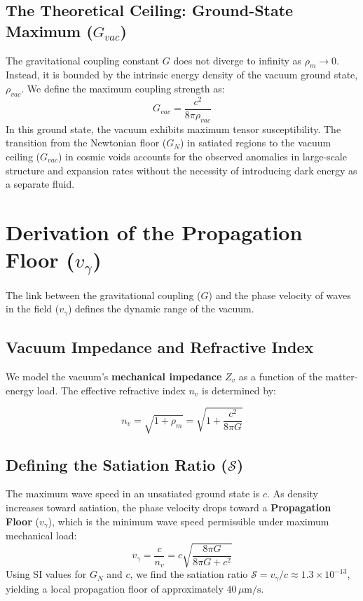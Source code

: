 \documentclass[12pt,a4paper]{article}
\begin{document}
\subsection{The Theoretical Ceiling: Ground-State Maximum ($G_{vac}$)}
The gravitational coupling constant $G$ does not diverge to infinity as $\rho_m \to 0$. Instead, it is bounded by the intrinsic energy density of the vacuum ground state, $\rho_{vac}$. We define the maximum coupling strength as:
\begin{equation}
G_{vac} = \frac{c^2}{8\pi \rho_{vac}}
\end{equation}
In this ground state, the vacuum exhibits maximum tensor susceptibility. The transition from the Newtonian floor ($G_N$) in satiated regions to the vacuum ceiling ($G_{vac}$) in cosmic voids accounts for the observed anomalies in large-scale structure and expansion rates without the necessity of introducing dark energy as a separate fluid.

\section{Derivation of the Propagation Floor ($v_{\gamma}$)}
The link between the gravitational coupling ($G$) and the phase velocity of waves in the field ($v_{\gamma}$) defines the dynamic range of the vacuum.

\subsection{Vacuum Impedance and Refractive Index}
We model the vacuum's \textbf{mechanical impedance} $Z_v$ as a function of the matter-energy load. The effective refractive index $n_v$ is determined by:

\begin{equation}
n_v = \sqrt{1 + \rho_m} = \sqrt{1 + \frac{c^2}{8\pi G}}
\end{equation}

\subsection{Defining the Satiation Ratio ($\mathcal{S}$)}
The maximum wave speed in an unsatiated ground state is $c$. As density increases toward satiation, the phase velocity drops toward a \textbf{Propagation Floor} ($v_{\gamma}$), which is the minimum wave speed permissible under maximum mechanical load:
\begin{equation}
v_{\gamma} = \frac{c}{n_v} = c \sqrt{\frac{8\pi G}{8\pi G + c^2}}
\end{equation}
Using SI values for $G_N$ and $c$, we find the satiation ratio $\mathcal{S} = v_{\gamma}/c \approx 1.3 \times 10^{-13}$, yielding a local propagation floor of approximately $40 \, \mu\text{m/s}$.
\end{document}
